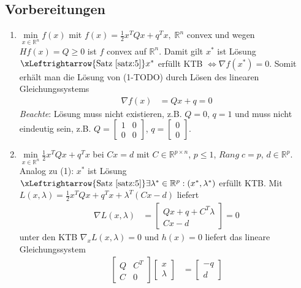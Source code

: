 \subsection{Vorbereitungen}
\begin{enumerate}[label=(\arabic*)]
  \item $\min\limits_{x\in\mathbb{R}^n}f(x)$ mit $f(x)=\frac12 x^TQx+q^Tx,\; \mathbb{R}^n$ convex und wegen $H f(x)=Q\ge 0$ ist $f$ convex auf $\mathbb{R}^n$. Damit gilt $x^{\ast}$ ist Lösung
  $\xLeftrightarrow{\text{Satz \ref{satz:5}}} x^{\ast}$ erfüllt \ac{KTB} $\Leftrightarrow\nabla f(x^{\ast})=0$. Somit erhält man die Lösung von (1-TODO) durch Lösen des linearen Gleichungssystems
  \begin{align*}
  	\nabla f(x) & = Qx+q =0
  \end{align*} 
  \textit{Beachte}: Lösung muss nicht existieren, z.B. $Q = 0$, $q = 1$ und muss nicht eindeutig sein, z.B. $Q = \begin{bmatrix}
  1	& 0\\ 0	& 0 \end{bmatrix}$, $q = \begin{bmatrix} 0 \\ 0 \end{bmatrix}$.
  \item $\min\limits_{x\in\mathbb{R}^n}\frac12 x^TQx+q^Tx$ bei $Cx=d$ mit $C\in\mathbb{R}^{p\times n}$, $p \le 1$, $Rang\; c = p$, $d\in\mathbb{R}^p$. Analog zu (1): $x^{\ast}$ ist Lösung
  $\xLeftrightarrow{\text{Satz \ref{satz:5}}}\exists\lambda^{\ast}\in\mathbb{R}^p:(x^{\ast},\lambda^{\ast})$ erfüllt \ac{KTB}. Mit $L(x,\lambda)=\frac12
  x^TQx+q^Tx+\lambda^T(Cx-d)$ liefert
  \begin{align*}
  \nabla L(x,\lambda) & = \begin{bmatrix}
  Qx+q+C^T\lambda \\
  Cx-d
  \end{bmatrix} = 0
  \end{align*} 
  unter den \ac{KTB} $\nabla_xL(x,\lambda)=0$ und $h(x)=0$ liefert das lineare Gleichungssystem
  \begin{align*}
  \begin{bmatrix}
  Q	& C^T\\ C	& 0 
  \end{bmatrix}\begin{bmatrix}
  x\\ \lambda
  \end{bmatrix} & = \begin{bmatrix}
  -q \\ d

\end{bmatrix}
\end{align*}
\end{enumerate}
